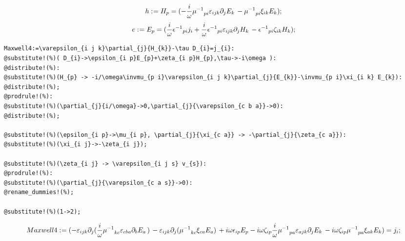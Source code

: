 \documentclass[11pt]{article}
\def\specialcolon{\mathrel{\mathop{:}}\hspace{-.5em}}
\begin{document}
\begin{dmath*}[compact, spread=2pt]
h\specialcolon{}= {H}_{p} = ( - \frac{i}{\omega} {\mu^{-1}}_{p i} {\varepsilon}_{i j k} {\partial}_{j}{{E}_{k}}\,  - {\mu^{-1}}_{p i} {\xi}_{i k} {E}_{k});
\end{dmath*}
\begin{dmath*}[compact, spread=2pt]
e\specialcolon{}= {E}_{p} = (\frac{i}{\omega} {\epsilon^{-1}}_{p i} {j}_{i} + \frac{i}{\omega} {\epsilon^{-1}}_{p i} {\varepsilon}_{i j k} {\partial}_{j}{{H}_{k}}\,  - {\epsilon^{-1}}_{p i} {\zeta}_{i k} {H}_{k});
\end{dmath*}
{\color[named]{Blue}\begin{verbatim}
Maxwell4:=\varepsilon_{i j k}\partial_{j}{H_{k}}-\tau D_{i}=j_{i}:
@substitute!(%)( D_{i}->\epsilon_{i p}E_{p}+\zeta_{i p}H_{p},\tau->-i\omega ):
@distribute!(%):
@substitute!(%)(H_{p} -> -i/\omega\invmu_{p i}\varepsilon_{i j k}\partial_{j}{E_{k}}-\invmu_{p i}\xi_{i k} E_{k}):
@distribute!(%);
@prodrule!(%):
@substitute!(%)(\partial_{j}{i/\omega}->0,\partial_{j}{\varepsilon_{c b a}}->0):
@distribute!(%);

@substitute!(%)(\epsilon_{i p}->\mu_{i p}, \partial_{j}{\xi_{c a}} -> -\partial_{j}{\zeta_{c a}}):
@substitute!(%)(\xi_{i j}->-\zeta_{i j});

@substitute!(%)(\zeta_{i j} -> \varepsilon_{i j s} v_{s}):
@prodrule!(%):
@substitute!(%)(\partial_{j}{\varepsilon_{c a s}}->0):
@rename_dummies!(%);

@substitute!(%)(1->2);
\end{verbatim}}
\begin{dmath*}[compact, spread=2pt]
Maxwell4\specialcolon{}= ( - {\varepsilon}_{i j k} {\partial}_{j}{(\frac{i}{\omega} {\mu^{-1}}_{k c} {\varepsilon}_{c b a} {\partial}_{b}{{E}_{a}}\, )}\,  - {\varepsilon}_{i j k} {\partial}_{j}{({\mu^{-1}}_{k c} {\xi}_{c a} {E}_{a})}\,  + i \omega {\epsilon}_{i p} {E}_{p} - i \omega {\zeta}_{i p} \frac{i}{\omega} {\mu^{-1}}_{p a} {\varepsilon}_{a j k} {\partial}_{j}{{E}_{k}}\,  - i \omega {\zeta}_{i p} {\mu^{-1}}_{p a} {\xi}_{a k} {E}_{k}) = {j}_{i};
\end{dmath*}
\end{document}
